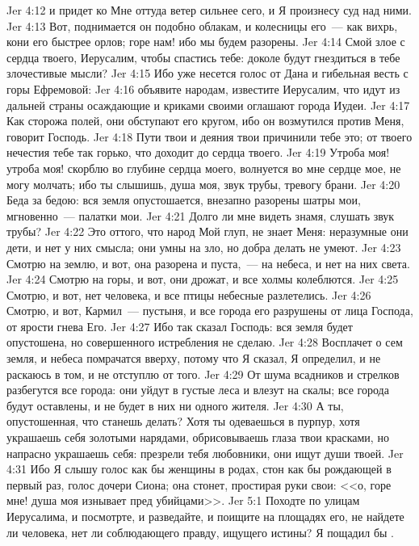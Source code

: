 \vs Jer 4:12 и придет ко Мне оттуда ветер сильнее сего, и Я произнесу суд над ними.
\vs Jer 4:13 Вот, поднимается он подобно облакам, и колесницы его~--- как вихрь, кони его быстрее орлов; горе нам! ибо мы будем разорены.
\vs Jer 4:14 Смой злое с сердца твоего, Иерусалим, чтобы спастись тебе: доколе будут гнездиться в тебе злочестивые мысли?
\vs Jer 4:15 Ибо уже несется голос от Дана и гибельная весть с горы Ефремовой:
\vs Jer 4:16 объявите народам, известите Иерусалим, что идут из дальней страны осаждающие и криками своими оглашают города Иудеи.
\vs Jer 4:17 Как сторожа полей, они обступают его кругом, ибо он возмутился против Меня, говорит Господь.
\vs Jer 4:18 Пути твои и деяния твои причинили тебе это; от твоего нечестия тебе так горько, что доходит до сердца твоего.
\vs Jer 4:19 Утроба моя! утроба моя! скорблю во глубине сердца моего, волнуется во мне сердце мое, не могу молчать; ибо ты слышишь, душа моя, звук трубы, тревогу брани.
\vs Jer 4:20 Беда за бедою: вся земля опустошается, внезапно разорены шатры мои, мгновенно~--- палатки мои.
\vs Jer 4:21 Долго ли мне видеть знамя, слушать звук трубы?
\vs Jer 4:22 Это оттого, что народ Мой глуп, не знает Меня: неразумные они дети, и нет у них смысла; они умны на зло, но добра делать не умеют.
\vs Jer 4:23 Смотрю на землю, и вот, она разорена и пуста,~--- на небеса, и нет на них света.
\vs Jer 4:24 Смотрю на горы, и вот, они дрожат, и все холмы колеблются.
\vs Jer 4:25 Смотрю, и вот, нет человека, и все птицы небесные разлетелись.
\vs Jer 4:26 Смотрю, и вот, Кармил~--- пустыня, и все города его разрушены от лица Господа, от ярости гнева Его.
\vs Jer 4:27 Ибо так сказал Господь: вся земля будет опустошена, но совершенного истребления не сделаю.
\vs Jer 4:28 Восплачет о сем земля, и небеса помрачатся вверху, потому что Я сказал, Я определил, и не раскаюсь в том, и не отступлю от того.
\vs Jer 4:29 От шума всадников и стрелков разбегутся все города: они уйдут в густые леса и влезут на скалы; все города будут оставлены, и не будет в них ни одного жителя.
\vs Jer 4:30 А ты, опустошенная, что станешь делать? Хотя ты одеваешься в пурпур, хотя украшаешь себя золотыми нарядами, обрисовываешь глаза твои красками, но напрасно украшаешь себя: презрели тебя любовники, они ищут души твоей.
\vs Jer 4:31 Ибо Я слышу голос как бы женщины в родах, стон как бы рождающей в первый раз, голос дочери Сиона; она стонет, простирая руки свои: <<о, горе мне! душа моя изнывает пред убийцами>>.
\vs Jer 5:1 Походте по улицам Иерусалима, и посмотрте, и разведайте, и поищите на площадях его, не найдете ли человека, нет ли соблюдающего правду, ищущего истины? Я пощадил бы .
